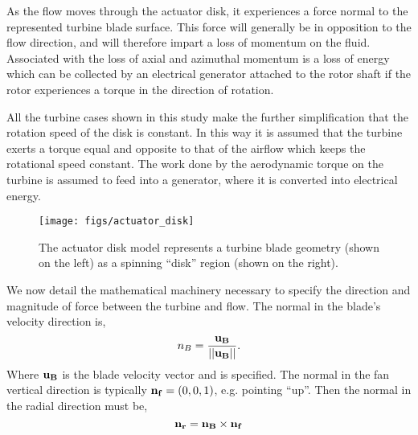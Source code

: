 As the flow moves through the actuator disk, it experiences a force
normal to the represented turbine blade surface. This force will
generally be in opposition to the flow direction, and will therefore
impart a loss of momentum on the fluid. 
Associated with the loss of axial and azimuthal momentum is a loss of
energy which can be collected by an electrical generator attached
to the rotor shaft if the rotor experiences a torque
in the direction of rotation. 

All the turbine cases shown in this study make the further
simplification that the rotation speed of the disk is constant. 
In this way it is assumed that the turbine exerts a torque equal and
opposite to that of the airflow which keeps the rotational speed
constant. The work done by the aerodynamic torque on the
turbine is assumed to feed into a generator, where it is converted into
electrical energy. 


   \begin{figure}[!htb]
    \centering
    \texttt{[image: figs/actuator\_disk]}
     \caption{The actuator disk model represents a turbine blade
    geometry (shown on the left) as a spinning ``disk'' region (shown
    on the right).}
     \label{fig:actuator_disk}
   \end{figure}

We now detail the mathematical machinery necessary to specify the
direction and magnitude of force between the turbine and flow. The
normal in the blade's velocity direction is, 
\begin{equation*}
n_B = \frac{{\bf u_B}}{||{\bf u_B}||}. 
\end{equation*}
Where ${\bf u_B}$ is the blade velocity vector and is specified. The
normal in the fan vertical direction is typically ${\bf n_f} =
\left(0,0,1\right)$, e.g. pointing ``up''. Then the normal in the radial
direction must be,  
\begin{equation*}
{\bf n_r} = {\bf n_B} \times {\bf n_f}
\end{equation*}



